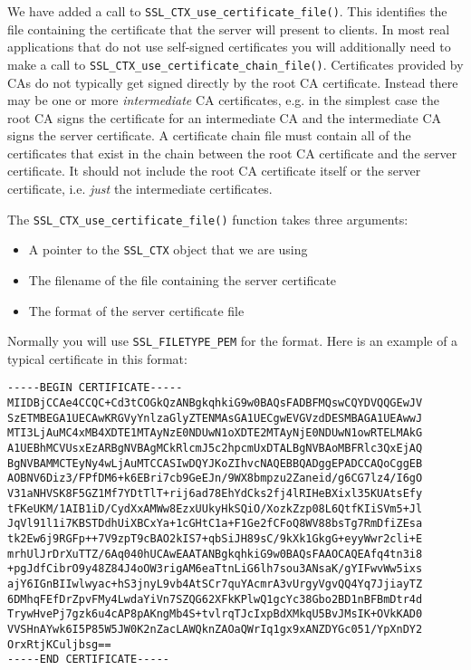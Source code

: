 We have added a call to \verb!SSL_CTX_use_certificate_file()!. This identifies 
the file containing the certificate that the server will present to clients. In 
most real applications that do not use self-signed certificates you will 
additionally need to make a call to 
\verb!SSL_CTX_use_certificate_chain_file()!. Certificates provided by CAs do 
not typically get signed directly by the root CA certificate. Instead there may 
be one or more \emph{intermediate} CA certificates, e.g. in the simplest case 
the root CA signs the certificate for an intermediate CA and the intermediate 
CA signs the server certificate. A certificate chain file must contain all of 
the certificates that exist in the chain between the root CA certificate and the
server certificate. It should not include the root CA certificate itself or the
server certificate, i.e. \emph{just} the intermediate certificates.

The \verb!SSL_CTX_use_certificate_file()! function takes three arguments:

\begin{itemize}
\item A pointer to the \texttt{SSL\_CTX} object that we are using
\item The filename of the file containing the server certificate
\item The format of the server certificate file
\end{itemize}

Normally you will use \verb!SSL_FILETYPE_PEM! for the format. Here is an 
example of a typical certificate in this format:

\begin{verbatim}
-----BEGIN CERTIFICATE-----
MIIDBjCCAe4CCQC+Cd3tCOGkQzANBgkqhkiG9w0BAQsFADBFMQswCQYDVQQGEwJV
SzETMBEGA1UECAwKRGVyYnlzaGlyZTENMAsGA1UECgwEVGVzdDESMBAGA1UEAwwJ
MTI3LjAuMC4xMB4XDTE1MTAyNzE0NDUwN1oXDTE2MTAyNjE0NDUwN1owRTELMAkG
A1UEBhMCVUsxEzARBgNVBAgMCkRlcmJ5c2hpcmUxDTALBgNVBAoMBFRlc3QxEjAQ
BgNVBAMMCTEyNy4wLjAuMTCCASIwDQYJKoZIhvcNAQEBBQADggEPADCCAQoCggEB
AOBNV6Diz3/FPfDM6+k6EBri7cb9GeEJn/9WX8bmpzu2Zaneid/g6CG7lz4/I6gO
V31aNHVSK8F5GZ1Mf7YDtTlT+rij6ad78EhYdCks2fj4lRIHeBXixl35KUAtsEfy
tFKeUKM/1AIB1iD/CydXxAMWw8EzxUUkyHkSQiO/XozkZzp08L6QtfKIiSVm5+Jl
JqVl91l1i7KBSTDdhUiXBCxYa+1cGHtC1a+F1Ge2fCFoQ8WV88bsTg7RmDfiZEsa
tk2Ew6j9RGFp++7V9zpT9cBAO2kIS7+qbSiJH89sC/9kXk1GkgG+eyyWwr2cli+E
mrhUlJrDrXuTTZ/6Aq040hUCAwEAATANBgkqhkiG9w0BAQsFAAOCAQEAfq4tn3i8
+pgJdfCibrO9y48Z84J4oOW3rigAM6eaTtnLiG6lh7sou3ANsaK/gYIFwvWw5ixs
ajY6IGnBIIwlwyac+hS3jnyL9vb4AtSCr7quYAcmrA3vUrgyVgvQQ4Yq7JjiayTZ
6DMhqFEfDrZpvFMy4LwdaYiVn7SZQG62XFkKPlwQ1gcYc38Gbo2BD1nBFBmDtr4d
TrywHvePj7gzk6u4cAP8pAKngMb4S+tvlrqTJcIxpBdXMkqU5BvJMsIK+OVkKAD0
VVSHnAYwk6I5P85W5JW0K2nZacLAWQknZAOaQWrIq1gx9xANZDYGc051/YpXnDY2
OrxRtjKCuljbsg==
-----END CERTIFICATE-----
\end{verbatim}

